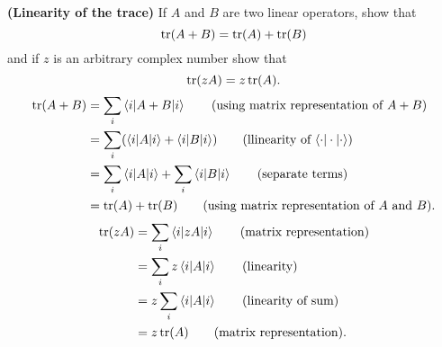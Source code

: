  \textbf{(Linearity of the trace)} If $A$ and $B$ are two linear operators, show that $$\operatorname{tr}(A+B)=\operatorname{tr}(A)+\operatorname{tr}(B)$$ and if $z$ is an arbitrary complex number show that $$\operatorname{tr}(zA) = z\operatorname{tr}(A).$$
\Soln
\begin{align*}
	\Tr (A + B) &= \sum_i \braket{i | A+B | i}  \tag{using matrix representation of $A+B$}\\
		&= \sum_i (\braket{i|A|i}  + \braket{i | B | i}  ) \tag{llinearity of $\braket{\cdot|\cdot|\cdot}$}\\
		&= \sum_i \braket{i|A|i} + \sum_i \braket{i|B|i} \tag{separate terms}\\
		&= \Tr (A) + \Tr (B) \tag{using matrix representation of $A$ and $B$}.
\end{align*}
\begin{align*}
	\operatorname{tr} (z A) &=  \sum_i \braket{i | z A | i} \tag{matrix representation}\\
		&= \sum_i z \braket{i | A | i} \tag{linearity}\\
		&= z \sum_i \braket{i | A | i}\tag{linearity of sum}\\
		&= z \operatorname{tr} (A) \tag{matrix representation}.
\end{align*}

